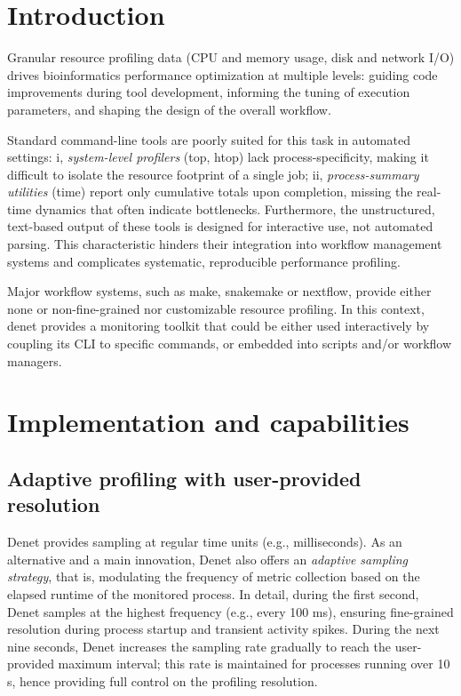 \documentclass[10pt]{article}
\renewcommand{\label}[1]{\gdef\labelname{##1}}%
\begin{document}
\section{Introduction}  %
\label{sec:intro}

Granular resource profiling data (CPU and memory usage, disk and network I/O)  drives bioinformatics performance optimization at multiple levels: guiding code improvements during tool development, informing the tuning of execution parameters, and shaping the design of the overall workflow.

Standard command-line tools are poorly suited for this task in automated settings: i, \emph{system-level profilers} (top, htop) lack process-specificity, making it difficult to isolate the resource footprint of a single job; ii, \emph{process-summary utilities} (time) report only cumulative totals upon completion, missing the real-time dynamics that often indicate bottlenecks. Furthermore, the unstructured, text-based output of these tools is designed for interactive use, not automated parsing. This characteristic hinders their integration into workflow management systems and complicates systematic, reproducible performance profiling.

Major workflow systems, such as make, snakemake or nextflow, provide either none or non-fine-grained nor customizable resource profiling. In this context, denet provides a monitoring toolkit that could be either used interactively by coupling its CLI to specific commands, or embedded into scripts and/or workflow managers.

\section{Implementation and capabilities}

\subsection{Adaptive profiling with user-provided resolution}

Denet provides sampling at regular time units (e.g., milliseconds). As an alternative and a main innovation, Denet also offers an \emph{adaptive sampling strategy}, that is, modulating the frequency of metric collection based on the elapsed runtime of the monitored process. In detail, during the first second, Denet samples at the highest frequency (e.g., every 100 ms), ensuring fine-grained resolution during process startup and transient activity spikes. During the next nine seconds, Denet  increases the sampling rate gradually to reach the user-provided maximum interval; this rate is maintained for processes running over 10 s, hence providing full control on the profiling resolution.
\end{document}
